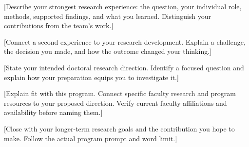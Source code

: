 \documentclass[11pt]{article}
\begin{document}

[Describe your strongest research experience: the question, your individual role, methods, supported findings, and what you learned. Distinguish your contributions from the team's work.]

[Connect a second experience to your research development. Explain a challenge, the decision you made, and how the outcome changed your thinking.]

[State your intended doctoral research direction. Identify a focused question and explain how your preparation equips you to investigate it.]

[Explain fit with this program. Connect specific faculty research and program resources to your proposed direction. Verify current faculty affiliations and availability before naming them.]

[Close with your longer-term research goals and the contribution you hope to make. Follow the actual program prompt and word limit.]
\end{document}
